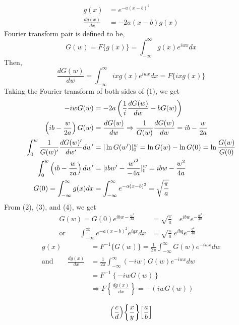 \documentclass[letterpage]{article}
\begin{document}
\begin{align}
  g(x)& =e^{-a(x-b)^2}\\
  \frac{dg(x)}{dx}& = -2a(x-b)g(x)
\end{align}
Fourier transform pair is defined to be,
\begin{equation}
  G(w) = F\{g(x)\} = \int_{-\infty}^\infty g(x)e^{iwx}dx
\end{equation}
Then,
\begin{equation}
  \frac{dG(w)}{dw} = \int_{-\infty}^\infty ixg(x)e^{iwx}dx = F\{ixg(x)\}
\end{equation}
Taking the Fourier transform of both sides of (1), we get
\begin{align}
  -iwG(w) &= -2a \left(\frac{1}{i} \frac{dG(w)}{dw} - bG(w)\right)\\
  \left(ib-\frac{w}{2a}\right) G(w) &= \frac{dG(w)}{dw} \Rightarrow
    \frac{1}{G(w)} \frac{dG(w)}{dw} = ib-\frac{w}{2a}\\
  \int_0^w \frac{1}{G(w)'} \frac{dG(w)'}{dw'} dw' &= 
    \arrowvert\ln G(w')\arrowvert_0^w = \ln G(w) - \ln G(0) 
    = \ln \frac{G(w)}{G(0)}\\
  \int_0^w \left(ib-\frac{w}{za}\right)dw' 
    &= \arrowvert ibw' - \frac{{w'}^2}{-4a}
    \arrowvert_0^w = ibw-\frac{w^2}{4a}\\
  G(0) = \int_{-\infty}^\infty g(x) dx &= \int_{-\infty}^\infty e^{-a(x-b)^2}
    = \sqrt{\frac{\pi}{a}}
\end{align}
From (2), (3), and (4), we get
\begin{align}
  G(w) = G(0) e^{ibw-\frac{w^2}{4a}} &= \sqrt{\frac{\pi}{a}} \quad e^{ibw} 
    e^{-\frac{w^2}{4a}}\\
  \text{or} \qquad
  \int_{-\infty}^\infty e^{-a(x-b)^2} e^{iqx}dx &= \sqrt{\frac{\pi}{a}}
    \: e^{ibq} e^{-\frac{q^2}{4a}}
\end{align}
\begin{align}
  g(x) &=F^{-1} \{G(w)\} = \frac{1}{2\pi} \int_{-\infty}^\infty 
    G(w)e^{-iwx}dw\\
  \text{and} \qquad \frac{dg(x)}{dx} &= \frac{1}{2\pi} \int_{-\infty}^\infty
    (-iw)G(w)e^{-iwx}dw\\
  &=F^{-1} \left\{-iwG(w)\right\}\\
  &\Rightarrow F\left\{\frac{dg(x)}{dx} \right\} = -(iwG(w))
\end{align}



\begin{equation}
  \mathopen{}\left( \frac{c}{d} \right)\mathclose{}
  \mathopen{}\left\lbrace \frac{x}{y} \right\rbrace\mathclose{}
  \mathopen{}\left[ \frac{a}{b} \right]\mathclose{}
\end{equation}
\end{document}
